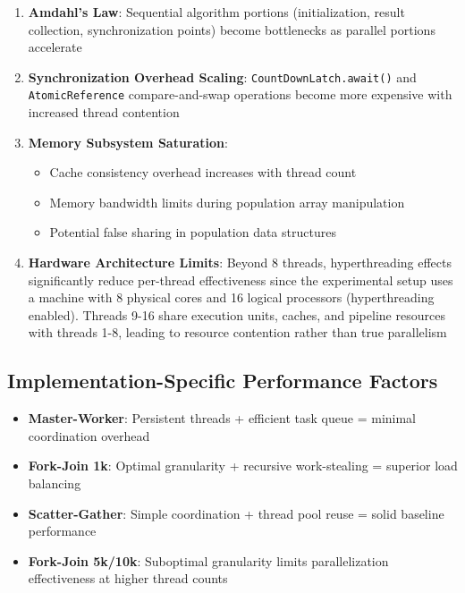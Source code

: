 \begin{enumerate}
   \item \textbf{Amdahl's Law}: Sequential algorithm portions (initialization,
   result collection, synchronization points) become bottlenecks as parallel
   portions accelerate
   \item \textbf{Synchronization Overhead Scaling}:
   \texttt{CountDownLatch.await()} and \texttt{AtomicReference} compare-and-swap
   operations become more expensive with increased thread contention
   \item \textbf{Memory Subsystem Saturation}:
      \begin{itemize}
      \item Cache consistency overhead increases with thread count
      \item Memory bandwidth limits during population array manipulation
      \item Potential false sharing in population data structures
      \end{itemize}
   \item \textbf{Hardware Architecture Limits}: Beyond 8 threads, hyperthreading
   effects significantly reduce per-thread effectiveness since the experimental
   setup uses a machine with 8 physical cores and 16 logical processors
   (hyperthreading enabled). Threads 9-16 share execution units, caches, and
   pipeline resources with threads 1-8, leading to resource contention rather
   than true parallelism
\end{enumerate}

\subsection{Implementation-Specific Performance Factors}

\begin{itemize}
   \item \textbf{Master-Worker}: Persistent threads + efficient task queue =
   minimal coordination overhead
   \item \textbf{Fork-Join 1k}: Optimal granularity + recursive work-stealing =
   superior load balancing
   \item \textbf{Scatter-Gather}: Simple coordination + thread pool reuse =
   solid baseline performance
   \item \textbf{Fork-Join 5k/10k}: Suboptimal granularity limits
   parallelization effectiveness at higher thread counts
\end{itemize}


